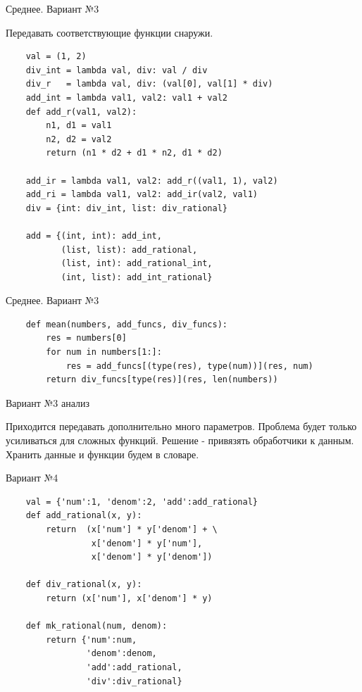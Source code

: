 \documentclass{article}
\begin{document}
\begin{center} Среднее. Вариант №3 \end{center}
Передавать соответствующие функции снаружи.
\begin{lstlisting}
    val = (1, 2)
    div_int = lambda val, div: val / div
    div_r   = lambda val, div: (val[0], val[1] * div)
    add_int = lambda val1, val2: val1 + val2
    def add_r(val1, val2):
        n1, d1 = val1
        n2, d2 = val2
        return (n1 * d2 + d1 * n2, d1 * d2)

    add_ir = lambda val1, val2: add_r((val1, 1), val2)
    add_ri = lambda val1, val2: add_ir(val2, val1)
    div = {int: div_int, list: div_rational}

    add = {(int, int): add_int, 
           (list, list): add_rational,
           (list, int): add_rational_int,
           (int, list): add_int_rational}
\end{lstlisting}
\newpage

\begin{center} Среднее. Вариант №3 \end{center}
\begin{lstlisting}
    def mean(numbers, add_funcs, div_funcs):
        res = numbers[0]
        for num in numbers[1:]:
            res = add_funcs[(type(res), type(num))](res, num)
        return div_funcs[type(res)](res, len(numbers))
\end{lstlisting}
\newpage

\begin{center} Вариант №3 анализ \end{center}
Приходится передавать дополнительно много параметров. Проблема будет только 
усиливаться для сложных функций. Решение - привязять обработчики к данным.
Хранить данные и функции будем в словаре.
\newpage

\begin{center} Вариант №4 \end{center}
\begin{lstlisting}
    val = {'num':1, 'denom':2, 'add':add_rational}
    def add_rational(x, y):
        return  (x['num'] * y['denom'] + \
                 x['denom'] * y['num'], 
                 x['denom'] * y['denom'])

    def div_rational(x, y):
        return (x['num'], x['denom'] * y)

    def mk_rational(num, denom):
        return {'num':num, 
                'denom':denom, 
                'add':add_rational, 
                'div':div_rational}
\end{lstlisting}
\newpage
\end{document}
